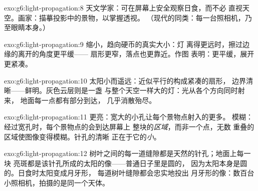 \begin{solution}{exo:g6:light-propagation:8}
天文学家：可在屏幕上安全观察日食，而不必
直视天空。画家：描摹投影中的景物，以掌握透视。
（现代的同类：每一台照相机，乃至眼睛本身。）
\end{solution}

\begin{solution}{exo:g6:light-propagation:9}
缩小，趋向硬币的真实大小：灯
离得更远时，擦过边缘的离开的角度更平缓——
扇形更窄，落点也更靠近。作图
表明：更平缓，展开更紧凑。
\end{solution}

\begin{solution}{exo:g6:light-propagation:10}
太阳小而遥远：近似平行的构成紧凑的扇形，
边界清晰——鲜明。灰色云层则是一盏
与整个天空一样大的灯：光从各个方向同时射来，
地面每一点都有部分到达，
几乎消散殆尽。
\end{solution}

\begin{solution}{exo:g6:light-propagation:11}
更亮：宽大的小孔让每个景物点射入的更多。
模糊：经过宽孔时，每个景物点的会到达屏幕上
整块的\emph{区域}，而非一个点，无数
重叠的区域使图像变得模糊。针孔的清晰
正在于它的\emph{小}。
\end{solution}

\begin{solution}{exo:g6:light-propagation:12}
树叶之间的每一道缝隙都是天然的针孔；地面上每一块
亮斑都是该针孔所成的太阳的像——普通日子里是圆的，
因为太阳本身是圆的。日食时太阳变成月牙形，
每道树叶缝隙都会忠实地投出
月牙形的像：数百台小照相机，拍摄的是同一个天体。
\end{solution}

